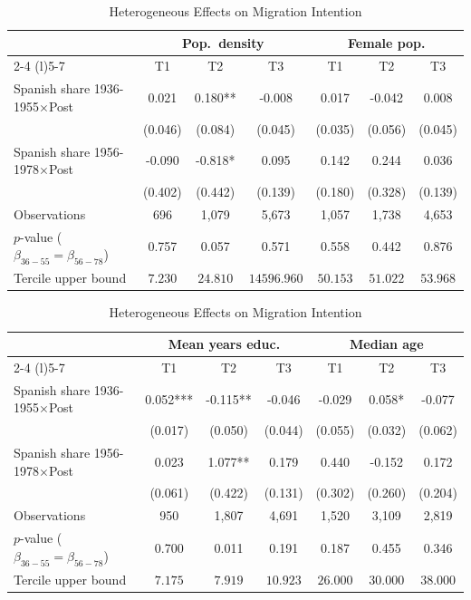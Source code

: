 \begin{table}[!h]
\centering
\renewcommand{\arraystretch}{0.95}
\setlength{\tabcolsep}{6pt}
\captionsetup{justification=centering}
\caption{Heterogeneous Effects on Migration Intention}
\begin{tabular*}{\textwidth}{l@{\extracolsep{\fill}}cccccc}
\hline
& \multicolumn{3}{c}{Pop.\ density} & \multicolumn{3}{c}{Female pop.} \\
\cmidrule(l){2-4} \cmidrule(l){5-7}
& T1 & T2 & T3 & T1 & T2 & T3 \\
\hline
Spanish share 1936-1955$\times$Post & 0.021 & 0.180** & -0.008 & 0.017 & -0.042 & 0.008 \\
 & (0.046) & (0.084) & (0.045) & (0.035) & (0.056) & (0.045) \\
Spanish share 1956-1978$\times$Post & -0.090 & -0.818* & 0.095 & 0.142 & 0.244 & 0.036 \\
  & (0.402) & (0.442) & (0.139) & (0.180) & (0.328) & (0.139) \\
\addlinespace
Observations & 696 & 1,079 & 5,673 & 1,057 & 1,738 & 4,653 \\
$p$-value ($\beta_{36{-}55} = \beta_{56{-}78}$) & 0.757 & 0.057 & 0.571 & 0.558 & 0.442 & 0.876 \\
Tercile upper bound & $7.230$ & $24.810$ & $14596.960$ & $50.153$ & $51.022$ & $53.968$ \\
\hline
\end{tabular*}
\begin{tabular*}{\textwidth}{l@{\extracolsep{\fill}}cccccc}
& \multicolumn{3}{c}{Mean years educ.} & \multicolumn{3}{c}{Median age} \\
\cmidrule(l){2-4} \cmidrule(l){5-7}
& T1 & T2 & T3 & T1 & T2 & T3 \\
\hline
Spanish share 1936-1955$\times$Post & 0.052*** & -0.115** & -0.046 & -0.029 & 0.058* & -0.077 \\
 & (0.017) & (0.050) & (0.044) & (0.055) & (0.032) & (0.062) \\
Spanish share 1956-1978$\times$Post & 0.023 & 1.077** & 0.179 & 0.440 & -0.152 & 0.172 \\
  & (0.061) & (0.422) & (0.131) & (0.302) & (0.260) & (0.204) \\
\addlinespace
Observations & 950 & 1,807 & 4,691 & 1,520 & 3,109 & 2,819 \\
$p$-value ($\beta_{36{-}55} = \beta_{56{-}78}$) & 0.700 & 0.011 & 0.191 & 0.187 & 0.455 & 0.346 \\
Tercile upper bound & $7.175$ & $7.919$ & $10.923$ & $26.000$ & $30.000$ & $38.000$ \\

\end{tabular*}
\end{table}
